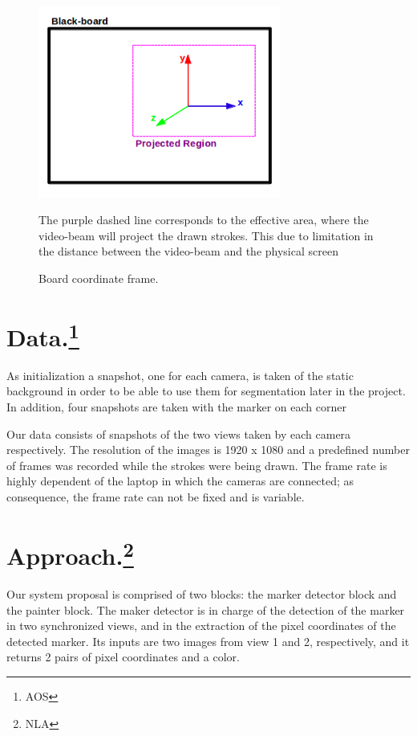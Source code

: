 \documentclass[a4paper,12pt]{article}
\begin{document}
\begin{figure}[H]
    \begin{center}
	\includegraphics[width=8cm]{boardCoordinates}
	\caption{Board coordinate frame.}
    The purple dashed line corresponds to the effective area, where the video-beam will project the drawn strokes. This due to limitation in the distance between the video-beam and the physical screen
	\label{fig:board}
    \end{center}
\end{figure}

\section[Data.]{Data.\footnote{AOS}}
As initialization a snapshot, one for each camera, is taken of the static background in order to be able to use them for segmentation later in the project. In addition, four snapshots are taken with the marker on each corner

Our data consists of snapshots of the two views taken by each camera respectively. The resolution of the images is 1920 x 1080 and a predefined number of frames was recorded while the strokes were being drawn. The frame rate is highly dependent of the laptop in which the cameras are connected; as consequence, the frame rate can not be fixed and is variable.


\section[Approach]{Approach.\footnote{NLA}}
Our system proposal is comprised of two blocks: the marker detector block and the painter block. The maker detector is in charge of the detection of the marker in two synchronized views, and in the extraction of the pixel coordinates of the detected marker. Its inputs are two images from view 1 and 2, respectively, and it returns 2 pairs of pixel coordinates and a color. 
\end{document}
